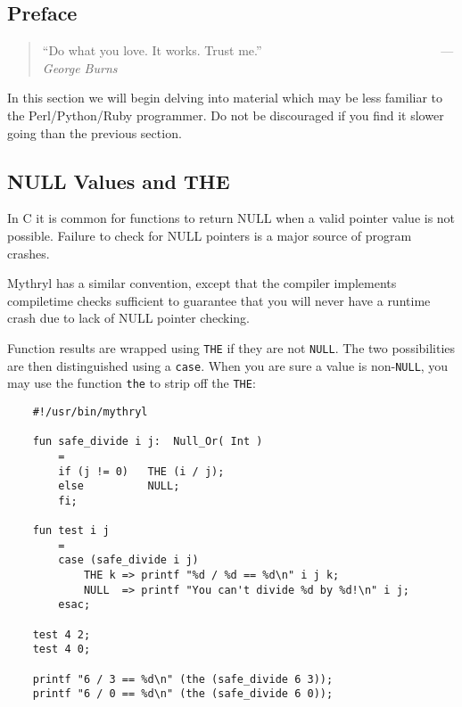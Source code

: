 
\subsection{Preface}
\label{section:tut:delving:preface}


\begin{quote}\begin{tiny}
       ``Do what you love.  It works.  Trust me.''\newline
         ~~~~~~~~~~~~~~~~~~~~~~~~~~~~---{\em George Burns}
\end{tiny}\end{quote}

In this section we will begin delving into material which may be 
less familiar to the Perl/Python/Ruby programmer.  Do not be 
discouraged if you find it slower going than the previous section.

\cutend*

\subsection{NULL Values and THE}

In C it is common for functions to return {\sc NULL} when 
a valid pointer value is not possible.  Failure to check 
for {\sc NULL} pointers is a major source of program crashes.

Mythryl has a similar convention, except that the compiler 
implements compiletime checks sufficient to guarantee that 
you will never have a runtime crash due to lack of {\sc NULL} 
pointer checking.

Function results are wrapped using {\tt THE} if they are not {\tt NULL}. 
The two possibilities are then distinguished using a {\tt case}.  When 
you are sure a value is non-{\tt NULL}, you may use the function {\tt the} 
to strip off the {\tt THE}:

\begin{verbatim}
    #!/usr/bin/mythryl

    fun safe_divide i j:  Null_Or( Int )
        =
        if (j != 0)   THE (i / j);
        else          NULL;
        fi; 

    fun test i j
        =
        case (safe_divide i j)
            THE k => printf "%d / %d == %d\n" i j k; 
            NULL  => printf "You can't divide %d by %d!\n" i j;
        esac; 

    test 4 2;
    test 4 0;

    printf "6 / 3 == %d\n" (the (safe_divide 6 3));
    printf "6 / 0 == %d\n" (the (safe_divide 6 0));
\end{verbatim}


